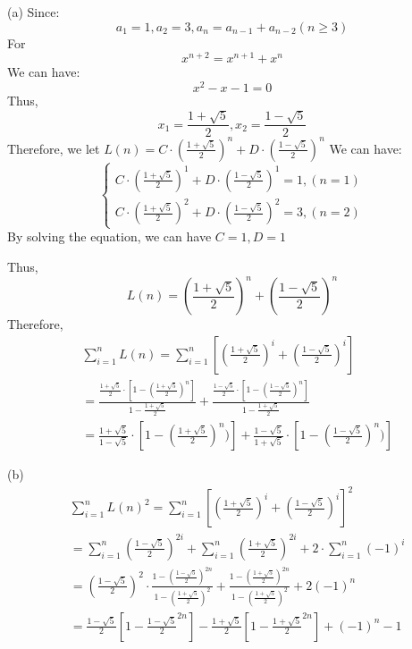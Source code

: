 \documentclass[12pt]{article}
\begin{document}
    \noindent (a) Since:
    $$a_1=1, a_2 = 3, a_n = a_{n-1}+a_{n-2} (n\geq3)$$
    For
    $$x^{n+2}=x^{n+1}+x^n$$
    We can have:
    $$x^2-x-1=0$$
    Thus,
    $$x_1=\frac{1+\sqrt{5}}{2}, x_2=\frac{1-\sqrt{5}}{2}$$
    Therefore, we let $L(n)=C\cdot(\frac{1+\sqrt{5}}{2})^n+D\cdot(\frac{1-\sqrt{5}}{2})^n$
    We can have:
    $$
        \begin{cases}
                C\cdot(\frac{1+\sqrt{5}}{2})^1+D\cdot(\frac{1-\sqrt{5}}{2})^1=1, (n=1) \\
                C\cdot(\frac{1+\sqrt{5}}{2})^2+D\cdot(\frac{1-\sqrt{5}}{2})^2=3, (n=2)
        \end{cases}
    $$
    By solving the equation, we can have $C=1, D=1$
    
    Thus,
    $$L(n)=(\frac{1+\sqrt{5}}{2})^n+(\frac{1-\sqrt{5}}{2})^n$$
    Therefore,
    \begin{align*}
        & \sum^n_{i=1}L(n)= \sum^n_{i=1}[(\frac{1+\sqrt{5}}{2})^i+(\frac{1-\sqrt{5}}{2})^i] \\
        & = \frac{\frac{1+\sqrt{5}}{2}\cdot[1-(\frac{1+\sqrt{5}}{2})^n]}{1-\frac{1+\sqrt{5}}{2}}+\frac{\frac{1-\sqrt{5}}{2}\cdot[1-(\frac{1-\sqrt{5}}{2})^n]}{1-\frac{1+\sqrt{5}}{2}}\\
        & = \frac{1+\sqrt{5}}{1-\sqrt{5}}\cdot[1-(\frac{1+\sqrt{5}}{2})^n)]+ \frac{1-\sqrt{5}}{1+\sqrt{5}}\cdot[1-(\frac{1-\sqrt{5}}{2})^n)]
    \end{align*}
    
    \noindent (b)
    \begin{align*}
        & \sum^n_{i=1}L(n)^2= \sum^n_{i=1}[(\frac{1+\sqrt{5}}{2})^i+(\frac{1-\sqrt{5}}{2})^i]^2 \\
        & = \sum^n_{i=1}(\frac{1-\sqrt{5}}{2})^{2i} + \sum^n_{i=1}(\frac{1+\sqrt{5}}{2})^{2i}+2\cdot\sum^n_{i=1}(-1)^i \\
        & = (\frac{1-\sqrt{5}}{2})^2\cdot\frac{1-(\frac{1-\sqrt{5}}{2})^{2n}}{1-(\frac{1+\sqrt{5}}{2})^{2}} + \frac{1-(\frac{1+\sqrt{5}}{2})^{2n}}{1-(\frac{1+\sqrt{5}}{2})^{2}} + 2(-1)^n \\
        & = \frac{1-\sqrt{5}}{2}[1-\frac{1-\sqrt{5}}{2}^{2n}]-\frac{1+\sqrt{5}}{2}[1-\frac{1+\sqrt{5}}{2}^{2n}]+(-1)^n-1
    \end{align*}
\end{document}
